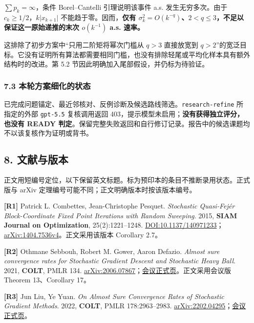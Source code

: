 \documentclass[
  chinese,
  10pt,
  a4paper,
]{article}
\begin{document}
\(\sum p_k=\infty\)，条件 Borel--Cantelli 引理说明该事件 a.s.
发生无穷多次。由于 \(c_k\ge1/2\)，\(k\lvert x_{k+1}\rvert\)
不能趋于零。因而，\textbf{仅有
\(\sigma_k^2=O(k^{-q})\)、\(2<q\le3\)，不足以保证这一原始递推的末次
\(o(k^{-1})\) a.s. 速率。}

这排除了初步方案中``只用二阶矩将幂次门槛从 \(q>3\) 直接放宽到
\(q>2\)''的宽泛目标。它没有证明所有算法都需要相同门槛，也没有排除轻尾或平均化样本具有额外结构时的改进。第
5.2 节因此明确加入尾部假设，并仍标为待验证。

\subsubsection{7.3
本轮方案细化的状态}\label{ux672cux8f6eux65b9ux6848ux7ec6ux5316ux7684ux72b6ux6001}

已完成问题锚定、最近邻核对、反例诊断及候选路线筛选。\texttt{research-refine}
所指定的外部 \texttt{gpt-5.5} 复核调用返回
403，提示模型未启用；\textbf{没有获得独立评分，也没有 READY
判定}。保留完整失败返回和自行修订记录。报告中的候选课题均不以该复核作为证明或背书。

\subsection{8. 文献与版本}\label{ux6587ux732eux4e0eux7248ux672c}

正文用短编号定位，以下保留英文标题。标为预印本的条目不推断录用状态。正式版与
arXiv 定理编号可能不同；正文明确版本时按该版本编号。

\textbf{{[}R1{]}} Patrick L. Combettes, Jean-Christophe Pesquet.
\emph{Stochastic Quasi-Fejér Block-Coordinate Fixed Point Iterations
with Random Sweeping}. 2015, \textbf{SIAM Journal on Optimization},
25(2):1221--1248.
\href{https://doi.org/10.1137/140971233}{DOI:10.1137/140971233}；\href{https://arxiv.org/abs/1404.7536v4}{arXiv:1404.7536v4}。正文采用该版本
Corollary 2.7。

\textbf{{[}R2{]}} Othmane Sebbouh, Robert M. Gower, Aaron Defazio.
\emph{Almost sure convergence rates for Stochastic Gradient Descent and
Stochastic Heavy Ball}. 2021, \textbf{COLT}, PMLR 134.
\href{https://arxiv.org/abs/2006.07867}{arXiv:2006.07867}；\href{https://proceedings.mlr.press/v134/sebbouh21a.html}{会议正式页}。正文采用会议版
Theorem 13、Corollary 17。

\textbf{{[}R3{]}} Jun Liu, Ye Yuan. \emph{On Almost Sure Convergence
Rates of Stochastic Gradient Methods}. 2022, \textbf{COLT}, PMLR
178:2963--2983.
\href{https://arxiv.org/abs/2202.04295}{arXiv:2202.04295}；\href{https://proceedings.mlr.press/v178/liu22d.html}{会议正式页}。
\end{document}
